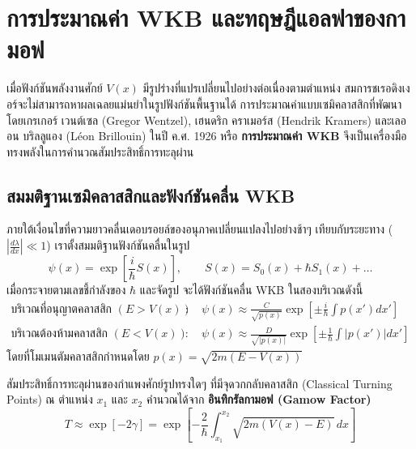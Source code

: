 \section{การประมาณค่า WKB และทฤษฎีแอลฟาของกามอฟ}
\label{sec_wkb_gamow}

เมื่อฟังก์ชันพลังงานศักย์ $V(x)$ มีรูปร่างที่แปรเปลี่ยนไปอย่างต่อเนื่องตามตำแหน่ง สมการชเรอดิงเงอร์จะไม่สามารถหาผลเฉลยแม่นยำในรูปฟังก์ชันพื้นฐานได้ การประมาณค่าแบบเซมิคลาสสิกที่พัฒนาโดยเกรเกอร์ เวนต์เซล (Gregor Wentzel), เฮนดริก คราเมอร์ส (Hendrik Kramers) และเลออน บริลลูแอง (Léon Brillouin) ในปี ค.ศ. 1926 หรือ \textbf{การประมาณค่า WKB} จึงเป็นเครื่องมือทรงพลังในการคำนวณสัมประสิทธิ์การทะลุผ่าน

\subsection{สมมติฐานเซมิคลาสสิกและฟังก์ชันคลื่น WKB}
ภายใต้เงื่อนไขที่ความยาวคลื่นเดอบรอยล์ของอนุภาคเปลี่ยนแปลงไปอย่างช้าๆ เทียบกับระยะทาง ($\left|\frac{d\lambda}{dx}\right| \ll 1$) เราตั้งสมมติฐานฟังก์ชันคลื่นในรูป
\begin{equation}
\psi(x) = \exp\left[ \frac{i}{\hbar} S(x) \right], \qquad S(x) = S_0(x) + \hbar S_1(x) + \dots
\end{equation}
เมื่อกระจายตามเลขชี้กำลังของ $\hbar$ และจัดรูป จะได้ฟังก์ชันคลื่น WKB ในสองบริเวณดังนี้
\begin{align}
\text{บริเวณที่อนุญาตคลาสสิก } (E > V(x)) \quad &\colon \quad \psi(x) \approx \frac{C}{\sqrt{p(x)}} \exp\left[ \pm \frac{i}{\hbar}\int p(x') dx' \right] \\
\text{บริเวณต้องห้ามคลาสสิก } (E < V(x)) \quad &\colon \quad \psi(x) \approx \frac{D}{\sqrt{|p(x)|}} \exp\left[ \pm \frac{1}{\hbar}\int |p(x')| dx' \right]
\end{align}
โดยที่โมเมนตัมคลาสสิกกำหนดโดย $p(x) = \sqrt{2m(E - V(x))}$

สัมประสิทธิ์การทะลุผ่านของกำแพงศักย์รูปทรงใดๆ ที่มีจุดวกกลับคลาสสิก (Classical Turning Points) ณ ตำแหน่ง $x_1$ และ $x_2$ คำนวณได้จาก \textbf{อินทิกรัลกามอฟ (Gamow Factor)}
\begin{equation}
T \approx \exp\left[ -2 \gamma \right] = \exp\left[ -\frac{2}{\hbar} \int_{x_1}^{x_2} \sqrt{2m(V(x) - E)} \, dx \right]
\end{equation}

